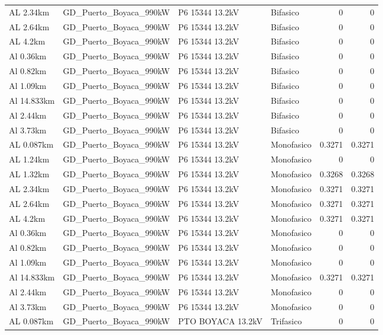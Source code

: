 \documentclass[11pt,a4paper]{article}
\begin{document}
\begin{longtable}{llllrr}
AL 2.34km & GD\_Puerto\_Boyaca\_990kW & P6 15344 13.2kV & Bifasico & 0 & 0 \\
AL 2.64km & GD\_Puerto\_Boyaca\_990kW & P6 15344 13.2kV & Bifasico & 0 & 0 \\
AL 4.2km & GD\_Puerto\_Boyaca\_990kW & P6 15344 13.2kV & Bifasico & 0 & 0 \\
Al 0.36km & GD\_Puerto\_Boyaca\_990kW & P6 15344 13.2kV & Bifasico & 0 & 0 \\
Al 0.82km & GD\_Puerto\_Boyaca\_990kW & P6 15344 13.2kV & Bifasico & 0 & 0 \\
Al 1.09km & GD\_Puerto\_Boyaca\_990kW & P6 15344 13.2kV & Bifasico & 0 & 0 \\
Al 14.833km & GD\_Puerto\_Boyaca\_990kW & P6 15344 13.2kV & Bifasico & 0 & 0 \\
Al 2.44km & GD\_Puerto\_Boyaca\_990kW & P6 15344 13.2kV & Bifasico & 0 & 0 \\
Al 3.73km & GD\_Puerto\_Boyaca\_990kW & P6 15344 13.2kV & Bifasico & 0 & 0 \\
AL 0.087km & GD\_Puerto\_Boyaca\_990kW & P6 15344 13.2kV & Monofasico & 0.3271 & 0.3271 \\
AL 1.24km & GD\_Puerto\_Boyaca\_990kW & P6 15344 13.2kV & Monofasico & 0 & 0 \\
AL 1.32km & GD\_Puerto\_Boyaca\_990kW & P6 15344 13.2kV & Monofasico & 0.3268 & 0.3268 \\
AL 2.34km & GD\_Puerto\_Boyaca\_990kW & P6 15344 13.2kV & Monofasico & 0.3271 & 0.3271 \\
AL 2.64km & GD\_Puerto\_Boyaca\_990kW & P6 15344 13.2kV & Monofasico & 0.3271 & 0.3271 \\
AL 4.2km & GD\_Puerto\_Boyaca\_990kW & P6 15344 13.2kV & Monofasico & 0.3271 & 0.3271 \\
Al 0.36km & GD\_Puerto\_Boyaca\_990kW & P6 15344 13.2kV & Monofasico & 0 & 0 \\
Al 0.82km & GD\_Puerto\_Boyaca\_990kW & P6 15344 13.2kV & Monofasico & 0 & 0 \\
Al 1.09km & GD\_Puerto\_Boyaca\_990kW & P6 15344 13.2kV & Monofasico & 0 & 0 \\
Al 14.833km & GD\_Puerto\_Boyaca\_990kW & P6 15344 13.2kV & Monofasico & 0.3271 & 0.3271 \\
Al 2.44km & GD\_Puerto\_Boyaca\_990kW & P6 15344 13.2kV & Monofasico & 0 & 0 \\
Al 3.73km & GD\_Puerto\_Boyaca\_990kW & P6 15344 13.2kV & Monofasico & 0 & 0 \\
AL 0.087km & GD\_Puerto\_Boyaca\_990kW & PTO BOYACA 13.2kV & Trifasico & 0 & 0 \\

\end{longtable}
\end{document}
